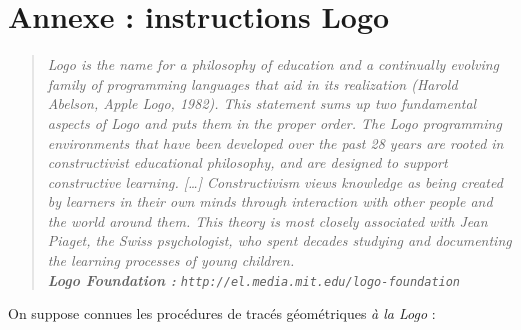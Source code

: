 \documentclass[11pt,a4paper]{article}
\begin{document}
\appendix
\newpage
\section{Annexe : instructions Logo}\label{logo}
\begin{quote}\scriptsize\em 
{\em Logo is the name for a philosophy of education and 
a continually evolving family of programming languages that aid in its realization
(Harold Abelson, Apple Logo, 1982).}
This statement sums up two fundamental aspects of Logo and puts them in the proper order. 
The Logo programming environments that have been developed over the past 28 years are 
rooted in constructivist educational philosophy, and are designed to support constructive 
learning. [\ldots]
Constructivism views knowledge as being created by learners in their own minds through 
interaction with other people and the world around them. This theory is most closely 
associated with Jean Piaget, the Swiss psychologist, who spent decades studying and 
documenting the learning processes of young children.\\
\mbox{}\hfill {\rm\bf Logo Foundation :} {\tt http://el.media.mit.edu/logo-foundation}
\end{quote}

On suppose connues les procédures de tracés géométriques {\em à la Logo} :\vspace*{2mm}
\end{document}
